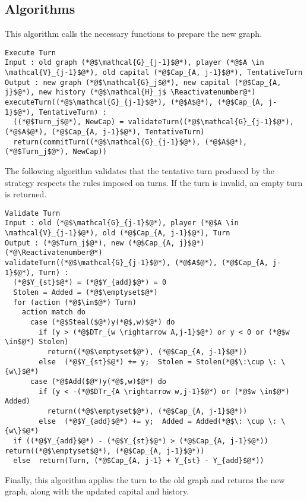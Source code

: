 \documentclass[11pt]{llncs}
\makeatletter
\newcommand*\Suppressnumber{%
  \lst@AddToHook{OnNewLine}{%
    \let\thelstnumber\relax%
     \advance\c@lstnumber-\@ne\relax%
    }%
}
\theoremstyle{definition}
\makeatother
\begin{document}
  \subsection{Algorithms}
    This algorithm calls the necessary functions to prepare the new graph.
    \Suppressnumber
    \begin{lstlisting}[label=executeturn, style=numbers]
Execute Turn
Input : old graph (*@$\mathcal{G}_{j-1}$@*), player (*@$A \in \mathcal{V}_{j-1}$@*), old capital (*@$Cap_{A, j-1}$@*), TentativeTurn
Output : new graph (*@$\mathcal{G}_j$@*), new capital (*@$Cap_{A, j}$@*), new history (*@$\mathcal{H}_j$ \Reactivatenumber@*)
executeTurn((*@$\mathcal{G}_{j-1}$@*), (*@$A$@*), (*@$Cap_{A, j-1}$@*), TentativeTurn) :
  ((*@$Turn_j$@*), NewCap) = validateTurn((*@$\mathcal{G}_{j-1}$@*), (*@$A$@*), (*@$Cap_{A, j-1}$@*), TentativeTurn)
  return(commitTurn((*@$\mathcal{G}_{j-1}$@*), (*@$A$@*), (*@$Turn_j$@*), NewCap))
    \end{lstlisting}
    The following algorithm validates that the tentative turn produced by the strategy respects the rules imposed on turns.
    If the turn is invalid, an empty turn is returned.
    \Suppressnumber
    \begin{lstlisting}[label=validateturn, style=numbers]
Validate Turn
Input : old (*@$\mathcal{G}_{j-1}$@*), player (*@$A \in \mathcal{V}_{j-1}$@*), old (*@$Cap_{A, j-1}$@*), Turn
Output : (*@$Turn_j$@*), new (*@$Cap_{A, j}$@*) (*@\Reactivatenumber@*)
validateTurn((*@$\mathcal{G}_{j-1}$@*), (*@$A$@*), (*@$Cap_{A, j-1}$@*), Turn) :
  (*@$Y_{st}$@*) = (*@$Y_{add}$@*) = 0
  Stolen = Added = (*@$\emptyset$@*)
  for (action (*@$\in$@*) Turn)
    action match do
      case (*@$Steal($@*)y(*@$,w)$@*) do
        if (y > (*@$DTr_{w \rightarrow A,j-1}$@*) or y < 0 or (*@$w \in$@*) Stolen)
          return((*@$\emptyset$@*), (*@$Cap_{A, j-1}$@*))
        else  (*@$Y_{st}$@*) += y;  Stolen = Stolen(*@$\:\cup \: \{w\}$@*)
      case (*@$Add($@*)y(*@$,w)$@*) do
        if (y < -(*@$DTr_{A \rightarrow w,j-1}$@*) or (*@$w \in$@*) Added)
          return((*@$\emptyset$@*), (*@$Cap_{A, j-1}$@*))
        else  (*@$Y_{add}$@*) += y;  Added = Added(*@$\: \cup \: \{w\}$@*)
  if ((*@$Y_{add}$@*) - (*@$Y_{st}$@*) > (*@$Cap_{A, j-1}$@*))  return((*@$\emptyset$@*), (*@$Cap_{A, j-1}$@*))
  else  return(Turn, (*@$Cap_{A, j-1} + Y_{st} - Y_{add}$@*))
    \end{lstlisting}
    Finally, this algorithm applies the turn to the old graph and returns the new graph, along with the updated capital and
    history.
    \Suppressnumber
\end{document}
